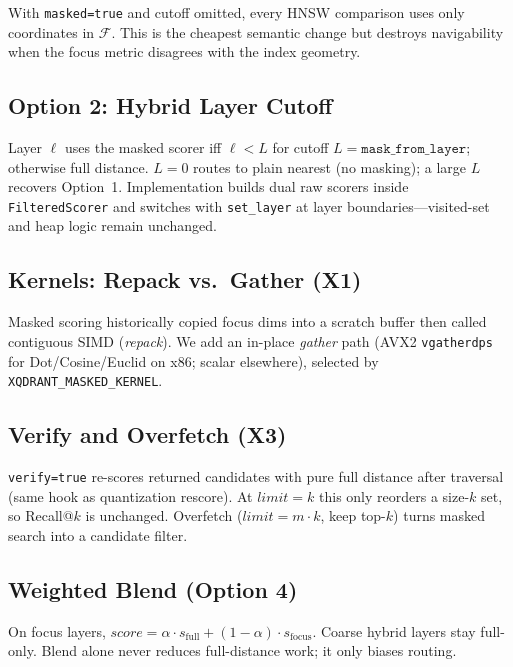\documentclass[11pt,a4paper]{article}
\begin{document}
With \texttt{masked=true} and cutoff omitted, every HNSW comparison uses only
coordinates in $\mathcal{F}$.
This is the cheapest semantic change but destroys navigability when the focus
metric disagrees with the index geometry.

\subsection{Option 2: Hybrid Layer Cutoff}

Layer $\ell$ uses the masked scorer iff $\ell < L$ for cutoff $L{=}\texttt{mask\_from\_layer}$;
otherwise full distance.
$L{=}0$ routes to plain nearest (no masking); a large $L$ recovers Option~1.
Implementation builds dual raw scorers inside \texttt{FilteredScorer} and switches
with \texttt{set\_layer} at layer boundaries---visited-set and heap logic remain
unchanged.

\subsection{Kernels: Repack vs.\ Gather (X1)}

Masked scoring historically copied focus dims into a scratch buffer then called
contiguous SIMD (\emph{repack}).
We add an in-place \emph{gather} path (AVX2 \texttt{vgatherdps} for Dot/Cosine/Euclid on
x86; scalar elsewhere), selected by \texttt{XQDRANT\_MASKED\_KERNEL}.

\subsection{Verify and Overfetch (X3)}

\texttt{verify=true} re-scores returned candidates with pure full distance after
traversal (same hook as quantization rescore).
At $\mathit{limit}{=}k$ this only reorders a size-$k$ set, so Recall@$k$ is
unchanged.
Overfetch ($\mathit{limit}{=}m{\cdot}k$, keep top-$k$) turns masked search into a
candidate filter.

\subsection{Weighted Blend (Option 4)}

On focus layers, $\textit{score}=\alpha\cdot s_{\mathrm{full}}+(1-\alpha)\cdot s_{\mathrm{focus}}$.
Coarse hybrid layers stay full-only.
Blend alone never reduces full-distance work; it only biases routing.

\end{document}
